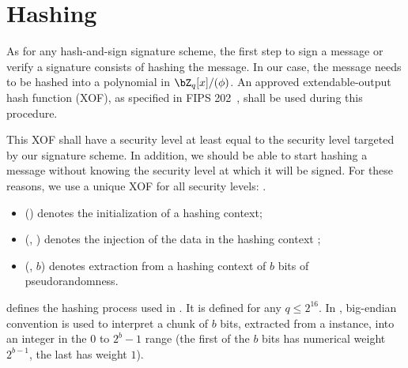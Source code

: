 \section{Hashing} \label{sec:spec:hash}

As for any hash-and-sign signature scheme, the first step to sign a message or verify a signature consists of hashing the message. In our case, the message needs to be hashed into a polynomial in $\bZ_q[x]/(\phi)$. An approved extendable-output hash function (XOF), as specified in FIPS 202~\cite{FIPS}, shall be used during this procedure.

This XOF shall have a security level at least equal to the security level targeted by our signature scheme. In addition, we should be able to start hashing a message without knowing the security level at which it will be signed. For these reasons, we use a unique XOF for all security levels: \shake.
\begin{itemize}
 \item \shakeinit() denotes the initialization of a \shake hashing context;
 \item \shakeinject(\shakectx, \str) denotes the injection of the data \str in the hashing context \shakectx;
 \item \shakeextract(\shakectx, $b$) denotes extraction from a hashing context \shakectx of $b$ bits of pseudorandomness.
\end{itemize}

\longhashtopoint defines the hashing process used in \falcon. It is defined for any $q \leq 2^{16}$. In \falcon, big-endian convention is used to interpret a chunk of $b$
bits, extracted from a \shake instance, into an integer in the $0$ to
$2^b-1$ range (the first of the $b$ bits has numerical weight $2^{b-1}$,
the last has weight $1$).

\begin{algorithm}[htb]
\caption{$\hashtopoint(\str, q, n)$}\label{alg:hashtopoint}
\begin{algorithmic}[1]
\State{$\shakectx \gets \shakeinit()$}
\State{$\shakeinject(\shakectx, \str)$}
\label{step:extract}
 \label{alg:hashtopoint:cmp}\label{step:check}
 \label{alg:hashtopoint:mod}
\EndIf
\EndWhile
{}
\end{algorithmic}
\end{algorithm}

